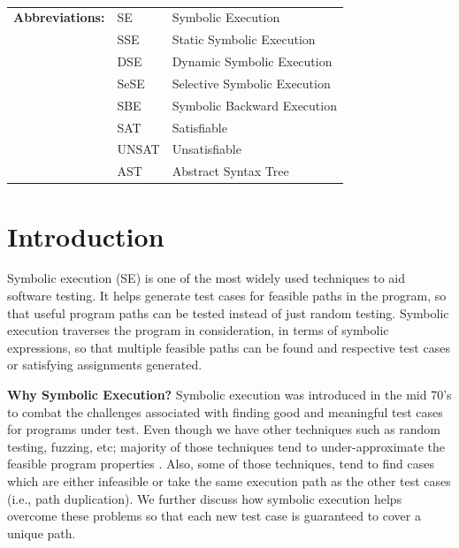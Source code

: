 \documentclass[11pt]{llncs}
\begin{document}
\vspace{-17mm}
	
$\>$ $\>$ $\>$ 
	\begin{table}[!]	
		\centering
		\setlength{\tabcolsep}{6pt}
		\begin{tabular}{l l l}
			\textbf{Abbreviations:} & SE & Symbolic Execution\\
			& SSE & Static Symbolic Execution\\
			& DSE & Dynamic Symbolic Execution\\
			& SeSE & Selective Symbolic Execution\\
			& SBE & Symbolic Backward Execution\\
			& SAT & Satisfiable\\
			& UNSAT & Unsatisfiable\\
			& AST & Abstract Syntax Tree

		\end{tabular}
	\end{table}




\section{Introduction} \label{Introduction}
	Symbolic execution (SE) is one of the most widely used techniques to aid software testing. It helps generate test cases for feasible paths in the program, so that useful program paths can be tested instead of just random testing.\cite{4_TP_SE} Symbolic execution traverses the program in consideration, in terms of symbolic expressions, so that multiple feasible paths can be found and respective test cases or satisfying assignments generated.

	\vspace{2mm}

	\textbf{Why Symbolic Execution?} Symbolic execution was introduced in the mid 70’s\cite{2_Survey_SE} to combat the challenges associated with finding good and meaningful test cases for programs under test. Even though we have other techniques such as random testing, fuzzing, etc; majority of those techniques tend to under-approximate the feasible program properties \cite{2_Survey_SE}. Also, some of those techniques, tend to find cases which are either infeasible or take the same execution path as the other test cases (i.e., path duplication). We further discuss how symbolic execution helps overcome these problems so that each new test case is guaranteed to cover a unique path.
\end{document}
